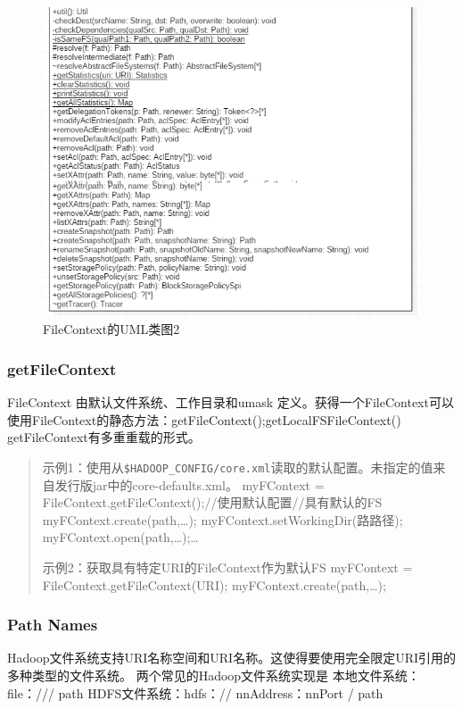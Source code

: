 \begin{figure}
\centering
\includegraphics[width=1\linewidth]{UML/abstractfilesystem/FileContext2.PNG}
\caption{FileContext的UML类图2}
\label{fig:FileContext2}
\end{figure}

\subsubsection{getFileContext}
FileContext 由默认文件系统、工作目录和umask 定义。获得一个FileContext可以使用FileContext的静态方法：getFileContext();getLocalFSFileContext()
getFileContext有多重重载的形式。
\begin{quote}
示例1：使用从\verb|$HADOOP_CONFIG/core.xml|读取的默认配置。未指定的值来自发行版jar中的core-defaults.xml。
myFContext = FileContext.getFileContext();//使用默认配置//具有默认的FS
myFContext.create(path,…);
myFContext.setWorkingDir(路路径);
myFContext.open(path,…);…


示例2：获取具有特定URI的FileContext作为默认FS
myFContext = FileContext.getFileContext(URI);
myFContext.create(path,…);
\end{quote}

\subsubsection{Path Names}
Hadoop文件系统支持URI名称空间和URI名称。这使得要使用完全限定URI引用的多种类型的文件系统。
两个常见的Hadoop文件系统实现是
本地文件系统：file：/// path
HDFS文件系统：hdfs：// nnAddress：nnPort / path

